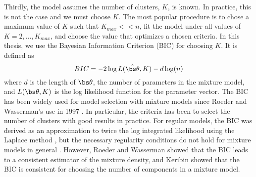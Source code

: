 Thirdly, the model assumes the number of clusters, $K$, is known. In practice, this is not the case and we must choose $K$. The most popular procedure is to chose a maximum value of $K$ such that $K_{max}<<n$, fit the model under all values of $K=2,...,K_{max}$, and choose the value that optimizes a chosen criteria. In this thesis, we use the Bayesian Information Criterion (BIC) \cite{schwarz1978} for choosing $K$. It is defined as
$$BIC = -2\log L(\hat{\bs\theta},K)- d\log(n)$$
where $d$ is the length of $\bs\theta$, the number of parameters in the mixture model, and $L(\bs\theta,K)$ is the log likelihood function for the parameter vector. The BIC has been widely used for model selection with mixture models since Roeder and Wasserman's use in 1997 \cite{roeder1997}. In particular, the criteria has been to select the number of clusters \cite{dasgupta1999,fraley1999} with good results in practice. For regular models, the BIC was derived as an approximation to twice the log integrated likelihood using the Laplace method \cite{tierney1986}, but the necessary regularity conditions do not hold for mixture models in general \cite{aitkin1985}. However, Roeder and Wasserman \cite{roeder1997} showed that the BIC leads to a consistent estimator of the mixture density, and Keribin \cite{keribin2000} showed that the BIC is consistent for choosing the number of components in a mixture model.

